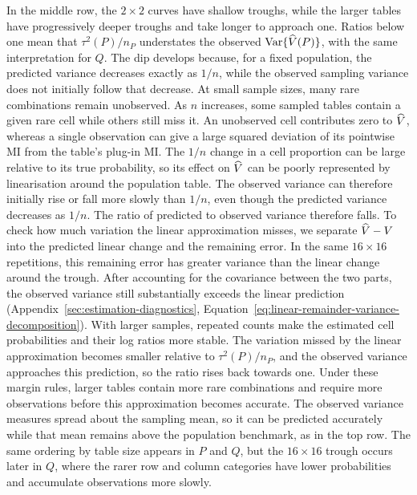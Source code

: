 In the middle row, the \(2\times2\) curves have shallow troughs,
while the larger tables have progressively deeper troughs and take
longer to approach one. Ratios below one mean that \(\tau^2(P)/n_P\)
understates the observed \(\operatorname{Var}\{\widehat V(P)\}\), with the same
interpretation for \(Q\). The dip develops because, for a fixed
population, the predicted variance decreases exactly as \(1/n\), while
the observed sampling variance does not initially follow that decrease.
At small sample sizes, many rare combinations remain unobserved. As
\(n\) increases, some sampled tables contain a given rare cell while
others still miss it. An unobserved cell contributes zero to \(\widehat V\),
whereas a single observation can give a large squared deviation of its
pointwise MI from the table's plug-in MI. The \(1/n\) change in a cell
proportion can be large relative to its true probability, so its effect
on \(\widehat V\) can be poorly represented by linearisation around the
population table. The observed variance can therefore initially rise or fall more slowly than
\(1/n\), even though the predicted variance decreases as \(1/n\). The
ratio of predicted to observed variance therefore falls.
To check how much variation the linear approximation misses, we separate
\(\widehat V-V\) into the predicted linear change and the remaining error.
In the same \(16\times16\) repetitions, this remaining error has greater
variance than the linear change around the trough. After accounting for
the covariance between the two parts, the observed variance still
substantially exceeds the linear prediction
(Appendix~\ref{sec:estimation-diagnostics},
Equation~\eqref{eq:linear-remainder-variance-decomposition}).
With larger samples, repeated
counts make the estimated cell probabilities and their log ratios more
stable. The variation missed by the linear approximation becomes smaller
relative to \(\tau^2(P)/n_P\), and the observed variance approaches
this prediction, so the ratio rises back towards one. Under these margin
rules, larger tables contain more rare combinations and require more
observations before this approximation becomes accurate. The observed
variance measures spread about the sampling mean, so it can be predicted
accurately while that mean remains above the population benchmark, as
in the top row. The same ordering by table size appears in \(P\) and
\(Q\), but the \(16\times16\) trough occurs later in \(Q\), where the
rarer row and column categories have lower probabilities and accumulate
observations more slowly.

